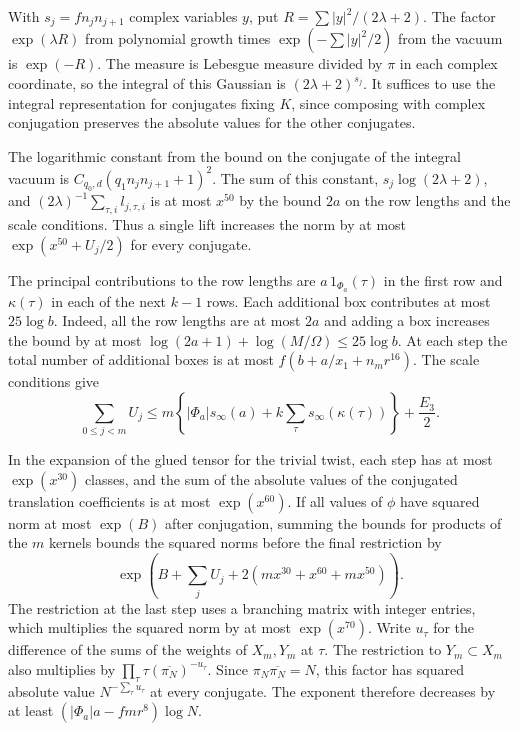 With \(s_j=f n_j n_{j+1}\) complex variables \(y\),
put \(R=\sum|y|^2/(2\lambda+2)\).
The factor \(\exp(\lambda R)\) from polynomial growth times
\(\exp(-\sum|y|^2/2)\) from the vacuum is \(\exp(-R)\).
The measure is Lebesgue measure divided by \(\pi\) in each complex
coordinate, so the integral of this Gaussian is \((2\lambda+2)^{s_j}\).
It suffices to use the integral representation for conjugates fixing
\(K\), since composing with complex conjugation preserves the
absolute values for the other conjugates.

The logarithmic constant from the bound on the conjugate of
the integral vacuum is \(C_{q_0,d}(q_1 n_j n_{j+1}+1)^2\).
The sum of this constant, \(s_j\log(2\lambda+2)\), and
\((2\lambda)^{-1}\sum_{\tau,i}l_{j,\tau,i}\) is at most \(x^{50}\)
by the bound \(2a\) on the row lengths and the scale conditions.
Thus a single lift increases the norm by at most
\(\exp(x^{50}+U_j/2)\) for every conjugate.

The principal contributions to the row lengths are \(a\,1_{\Phi_a}(\tau)\)
in the first row and \(\kappa(\tau)\) in each of the next \(k-1\) rows.
Each additional box contributes at most \(25\log b\). Indeed, all the
row lengths are at most \(2a\) and adding a box increases the bound by at
most \(\log(2a+1)+\log(M/\Omega)\le25\log b\).
At each step the total number of additional boxes is at most
\(f(b+a/x_1+n_m r^{16})\).
The scale conditions give
\begin{equation}\label{eq:upper-rows}
 \sum_{0\le j<m}U_j
 \le m\left\{|\Phi_a|s_\infty(a)+k\sum_\tau s_\infty(\kappa(\tau))\right\}
         +\frac{E_3}{2}.
\end{equation}

In the expansion of the glued tensor for the trivial twist, each step
has at most \(\exp(x^{30})\) classes, and the sum of the absolute values
of the conjugated translation coefficients is at most \(\exp(x^{60})\).
If all values of \(\phi\) have squared norm at most \(\exp(B)\) after
conjugation, summing the bounds for products of the \(m\) kernels
bounds the squared norms before the final restriction by
\[
  \exp\!\left(B+\sum_j U_j
             +2(mx^{30}+x^{60}+mx^{50})\right).
\]
The restriction at the last step uses a branching matrix with
integer entries, which multiplies the
squared norm by at most \(\exp(x^{70})\).
Write \(u_\tau\) for the difference of the sums of the weights of
\(X_m,Y_m\) at \(\tau\). The restriction to \(Y_m\subset X_m\)
also multiplies by \(\prod_\tau\tau(\overline{\pi_N})^{-u_\tau}\).
Since \(\pi_N\overline{\pi_N}=N\), this factor has squared absolute value
\(N^{-\sum_\tau u_\tau}\) at every conjugate. The exponent therefore
decreases by at least \((|\Phi_a|a-fmr^8)\log N\).

